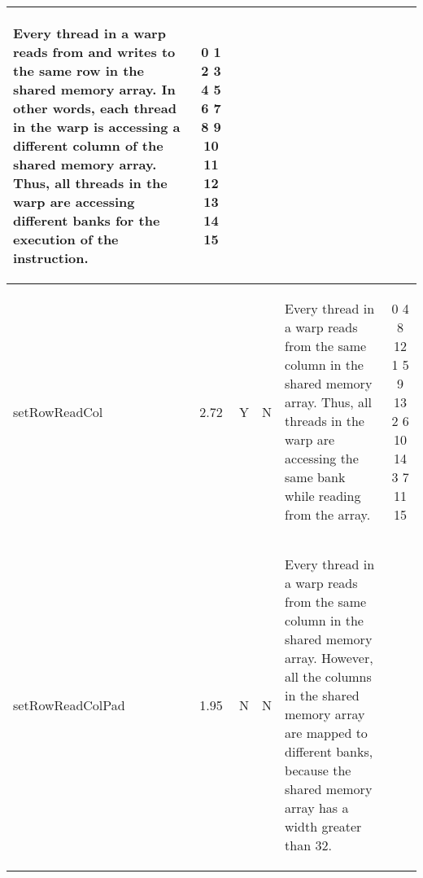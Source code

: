 \documentclass[a4paper,9pt]{article}
\begin{document}
\begin{table}[H]
{\begin{tabular}{p{4.8em}cccp{10em}c}
\begin{spacing}{0.6}
                                            {\footnotesize
                                              Every thread in a warp reads from and writes to the same row in the shared memory array.
                                              In other words, each thread in the warp is accessing a different column of the shared memory array.
                                              Thus, all threads in the warp are accessing different banks for the execution of the instruction.
                                            }
                                            \vspace*{-\baselineskip}
                                            \end{spacing}
                                            \vspace*{-\baselineskip}
                                            & \multicolumn{1}{p{5em}}{0    1    2    3    4    5    6    7    8    9   10   11   12   13   14   15}\\ \hline
          {\footnotesize setRowReadCol}    & 2.72 & Y & N & 
                                            \begin{spacing}{0.6}
                                            {\footnotesize
                                              Every thread in a warp reads from the same column in the shared memory array.
                                              Thus, all threads in the warp are accessing the same bank while reading from the array.
                                            }
                                            \vspace*{-\baselineskip}
                                            \end{spacing}
                                            \vspace*{-\baselineskip}
                                            & \multicolumn{1}{p{5em}}{0    4    8   12    1    5    9   13    2    6   10   14    3    7   11   15}\\ \hline
          {\footnotesize setRowReadColPad} & 1.95 & N & N & 
                                            \begin{spacing}{0.6}
                                            {\footnotesize
                                              Every thread in a warp reads from the same column in the shared memory array.
                                              However, all the columns in the shared memory array are mapped to different banks, because the shared memory array has a width greater than 32.
}
\end{spacing}
\end{tabular}}
\end{table}
\end{document}
